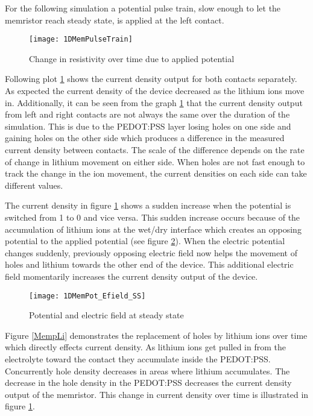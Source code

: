 \begin{doublespace}
For the following simulation a potential pulse train, slow enough to let the memristor reach steady state, is applied at the left contact.
\begin{figure}[!htp]
\centering
\texttt{[image: 1DMemPulseTrain]}
\caption{Change in resistivity over time due to applied potential} 
\label{MemResTrain}
\end{figure}
 Following plot \ref{MemResTrain} shows the current density output for both contacts separately. As expected the current density of the device decreased as the lithium ions move in. Additionally, it can be seen from the graph \ref{MemResTrain} that the current density output from left and right contacts are not always the same over the duration of the simulation. This is due to the PEDOT:PSS layer losing holes on one side and gaining holes on the other side which produces a difference in the measured current density between contacts. The scale of the difference depends on the rate of change in lithium movement on either side. When holes are not fast enough to track the change in the ion movement, the current densities on each side can take different values.  

The current density in figure \ref{MemResTrain} shows a sudden increase when the potential is switched from 1 to 0 and vice versa. This sudden increase occurs because of the accumulation of lithium ions at the wet/dry interface which creates an opposing potential to the applied potential (see figure \ref{MemEss}). When the electric potential changes suddenly, previously opposing electric field now helps the movement of holes and lithium towards the other end of the device. This additional electric field momentarily increases the current density output of the device.

\begin{figure}[!htp]
\centering
\texttt{[image: 1DMemPot\_Efield\_SS]}
\caption{Potential and electric field at steady state} 
\label{MemEss}
\end{figure}

Figure \ref{MempLi} demonstrates the replacement of holes by lithium ions over time which directly effects current density.  As lithium ions get pulled in from the electrolyte toward the contact they accumulate inside the PEDOT:PSS. Concurrently hole density decreases in areas where lithium accumulates. The decrease in the hole density in the PEDOT:PSS decreases the current density output of the memristor. This change in current density over time is illustrated in figure \ref{MemResTrain}.


\end{doublespace}
